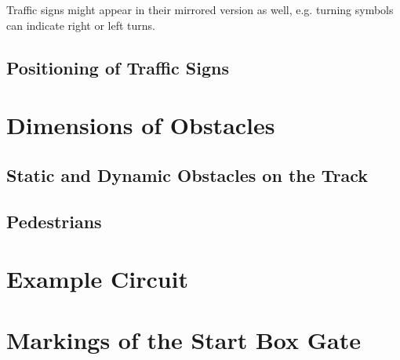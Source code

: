 Traffic signs might appear in their mirrored version as well, e.g. turning
symbols can indicate right or left turns.

\begin{figure}[H]
	\begin{center}
		\centering
	\end{center}
\end{figure}

\subsection{Positioning of Traffic Signs}
\begin{figure}[H]
	\begin{center}
		\centering
	\end{center}
\end{figure}

\section{Dimensions of Obstacles}
\subsection{Static and Dynamic Obstacles on the Track}
\label{fig_obstacle_dimensions}
\begin{figure}[H]
	\begin{center}
		\centering
	\end{center}
\end{figure}

\subsection{Pedestrians}
\label{fig_pedestrians}
\begin{figure}[H]
	\begin{center}
		\centering
	\end{center}
\end{figure}

\section{Example Circuit}
\label{fig_example_circuit}
\vspace*{2cm}
\begin{figure}[H]
	\begin{center}
		\centering
	\end{center}
\end{figure}

\section{Markings of the Start Box Gate}
\label{fig_start_box_markings}
\begin{figure}[H]
	\begin{center}
		\centering
	\end{center}
\end{figure}